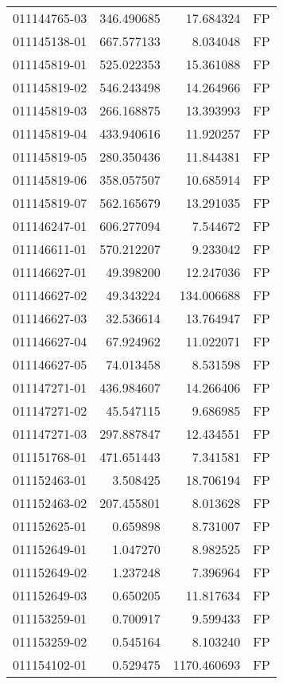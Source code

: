 \begin{tabular}{lrrl}
011144765-03 &  346.490685 &    17.684324 &   FP \\
011145138-01 &  667.577133 &     8.034048 &   FP \\
011145819-01 &  525.022353 &    15.361088 &   FP \\
011145819-02 &  546.243498 &    14.264966 &   FP \\
011145819-03 &  266.168875 &    13.393993 &   FP \\
011145819-04 &  433.940616 &    11.920257 &   FP \\
011145819-05 &  280.350436 &    11.844381 &   FP \\
011145819-06 &  358.057507 &    10.685914 &   FP \\
011145819-07 &  562.165679 &    13.291035 &   FP \\
011146247-01 &  606.277094 &     7.544672 &   FP \\
011146611-01 &  570.212207 &     9.233042 &   FP \\
011146627-01 &   49.398200 &    12.247036 &   FP \\
011146627-02 &   49.343224 &   134.006688 &   FP \\
011146627-03 &   32.536614 &    13.764947 &   FP \\
011146627-04 &   67.924962 &    11.022071 &   FP \\
011146627-05 &   74.013458 &     8.531598 &   FP \\
011147271-01 &  436.984607 &    14.266406 &   FP \\
011147271-02 &   45.547115 &     9.686985 &   FP \\
011147271-03 &  297.887847 &    12.434551 &   FP \\
011151768-01 &  471.651443 &     7.341581 &   FP \\
011152463-01 &    3.508425 &    18.706194 &   FP \\
011152463-02 &  207.455801 &     8.013628 &   FP \\
011152625-01 &    0.659898 &     8.731007 &   FP \\
011152649-01 &    1.047270 &     8.982525 &   FP \\
011152649-02 &    1.237248 &     7.396964 &   FP \\
011152649-03 &    0.650205 &    11.817634 &   FP \\
011153259-01 &    0.700917 &     9.599433 &   FP \\
011153259-02 &    0.545164 &     8.103240 &   FP \\
011154102-01 &    0.529475 &  1170.460693 &   FP \\

\end{tabular}
